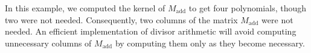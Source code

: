 \begin{remark}
In this example, we computed the kernel of $M_{\text{add}}$ to get four polynomials, though two were not needed.
Consequently, two columns of the matrix $M_{\text{add}}$ were not needed.
An efficient implementation of divisor arithmetic will avoid computing unnecessary columns of $M_{\text{add}}$
by computing them only as they become necessary.
\end{remark}




\begin{comment}
\subsection{An example -- non-disjoint case}

Consider again the curve $C : y^3 + x^4 + 1$ over $\bb F_{11}$.
Let $D$ and $D'$ be type 31 divisors with
\begin{align*}
  D  &= \pid{f, g, h}      & D' &= \pid{f', g', h'} \\
  f  &= x^2 + 10           & f' &= x^2 + 3y + 2x + 2 \\
  g  &= xy + y + 9x + 9    & g' &= xy + 4x + 5 \\
  h  &= y^2 + 10y + 4x + 5 & h' &= y^2 + y + 2x + 3 .\\
\end{align*}
These divisors are non-disjoint. We have
\begin{align*}
  D &= (1 : 2 : 1) + (10 : 2\alpha + 4 : 1) + (10 : 10\alpha + 8 : 1) \\
  D' &= (1 : 2 : 1) + (3 : 9 : 1) + (5 : 6 : 1)
\end{align*}
where $\alpha \in \bb F_{11^2}$ is a root of $x^2 + 7x + 2$.

\begin{center}
  \begin{tikzcd}
    W_L^{x^4} \arrow[hook]{r}{\ker M} & 
    W_D^{x^4} \arrow[hook]{r}{\iota} \arrow[bend left]{rr}{M} & 
    W^{x^4} \arrow[two heads]{r}{\pi} & 
    \frac {W^{x^4}} {W_{D'}^{x^4}} \arrow[two heads]{r}{\im M} &
    W_G^y \\ &
    K^7 \arrow[hook]{r} \arrow[no head]{u}{\rotatebox{90}{$\simeq$}} &
    K^{10} \arrow[two heads]{r} \arrow[no head]{u}{\rotatebox{90}{$\simeq$}} &
    K^3 \arrow[no head]{u}{\rotatebox{90}{$\simeq$}}.
  \end{tikzcd}
\end{center}


\end{comment}
